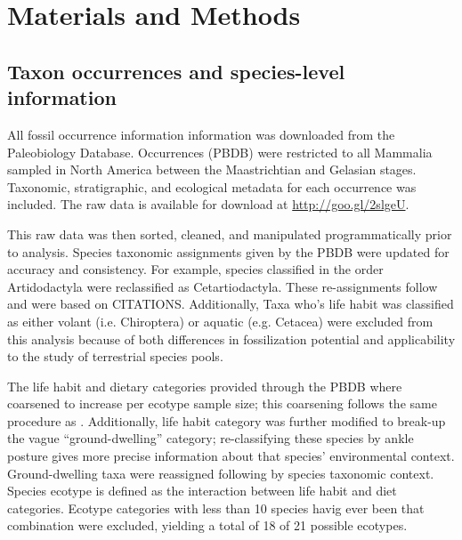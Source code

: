 \documentclass[12pt,letterpaper]{article}
\begin{document}
\section*{Materials and Methods}

\subsection*{Taxon occurrences and species-level information}
All fossil occurrence information information was downloaded from the Paleobiology Database. Occurrences (PBDB) were restricted to all Mammalia sampled in North America between the Maastrichtian and Gelasian stages. Taxonomic, stratigraphic, and ecological metadata for each occurrence was included. The raw data is available for download at \url{http://goo.gl/2slgeU}.

This raw data was then sorted, cleaned, and manipulated programmatically prior to analysis. Species taxonomic assignments given by the PBDB were updated for accuracy and consistency. For example, species classified in the order Artidodactyla were reclassified as Cetartiodactyla. These re-assignments follow \citet{Smits2015} and were based on CITATIONS. Additionally, Taxa who's life habit was classified as either volant (i.e. Chiroptera) or aquatic (e.g. Cetacea) were excluded from this analysis because of both differences in fossilization potential and applicability to the study of terrestrial species pools.

The life habit and dietary categories provided through the PBDB where coarsened to increase per ecotype sample size; this coarsening follows the same procedure as \citet{Smits2015}. Additionally, life habit category was further modified to break-up the vague ``ground-dwelling'' category; re-classifying these species by ankle posture gives more precise information about that species' environmental context. Ground-dwelling taxa were reassigned following \citet{Carrano1997} by species taxonomic context. Species ecotype is defined as the interaction between life habit and diet categories. Ecotype categories with less than 10 species havig ever been that combination were excluded, yielding a total of 18 of 21 possible ecotypes. %
\end{document}

